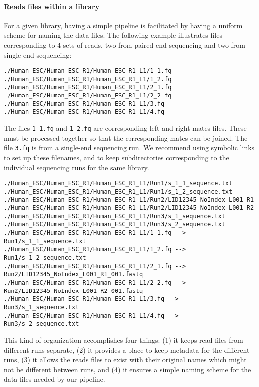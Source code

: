 \documentclass[10pt]{article}
\newcommand{\fn}[1]{\texttt{#1}}
\begin{document}
\paragraph{Reads files within a library}
For a given library, having a simple pipeline is facilitated by having
a uniform scheme for naming the data files. The following example
illustrates files corresponding to 4 sets of reads, two from
paired-end sequencing and two from single-end sequencing:
\begin{verbatim}
./Human_ESC/Human_ESC_R1/Human_ESC_R1_L1/1_1.fq
./Human_ESC/Human_ESC_R1/Human_ESC_R1_L1/1_2.fq
./Human_ESC/Human_ESC_R1/Human_ESC_R1_L1/2_1.fq
./Human_ESC/Human_ESC_R1/Human_ESC_R1_L1/2_2.fq
./Human_ESC/Human_ESC_R1/Human_ESC_R1_L1/3.fq
./Human_ESC/Human_ESC_R1/Human_ESC_R1_L1/4.fq
\end{verbatim}
The files \fn{1\_1.fq} and \fn{1\_2.fq} are corresponding left and
right mates files. These must be processed together so that the
corresponding mates can be joined. The file \fn{3.fq} is from a
single-end sequencing run. We recommend using symbolic links to set up
these filenames, and to keep subdirectories corresponding to the
individual sequencing runs for the same library.
\begin{verbatim}
./Human_ESC/Human_ESC_R1/Human_ESC_R1_L1/Run1/s_1_1_sequence.txt
./Human_ESC/Human_ESC_R1/Human_ESC_R1_L1/Run1/s_1_2_sequence.txt
./Human_ESC/Human_ESC_R1/Human_ESC_R1_L1/Run2/LID12345_NoIndex_L001_R1_001.fastq
./Human_ESC/Human_ESC_R1/Human_ESC_R1_L1/Run2/LID12345_NoIndex_L001_R2_001.fastq
./Human_ESC/Human_ESC_R1/Human_ESC_R1_L1/Run3/s_1_sequence.txt
./Human_ESC/Human_ESC_R1/Human_ESC_R1_L1/Run3/s_2_sequence.txt
./Human_ESC/Human_ESC_R1/Human_ESC_R1_L1/1_1.fq --> Run1/s_1_1_sequence.txt
./Human_ESC/Human_ESC_R1/Human_ESC_R1_L1/1_2.fq --> Run1/s_1_2_sequence.txt
./Human_ESC/Human_ESC_R1/Human_ESC_R1_L1/2_1.fq --> Run2/LID12345_NoIndex_L001_R1_001.fastq
./Human_ESC/Human_ESC_R1/Human_ESC_R1_L1/2_2.fq --> Run2/LID12345_NoIndex_L001_R2_001.fastq
./Human_ESC/Human_ESC_R1/Human_ESC_R1_L1/3.fq --> Run3/s_1_sequence.txt
./Human_ESC/Human_ESC_R1/Human_ESC_R1_L1/4.fq --> Run3/s_2_sequence.txt
\end{verbatim}
This kind of organization accomplishes four things: (1) it keeps read
files from different runs separate, (2) it provides a place to keep
metadata for the different runs, (3) it allows the reads files to
exist with their original names which might not be different between
runs, and (4) it ensures a simple naming scheme for the data files
needed by our pipeline.
\end{document}
